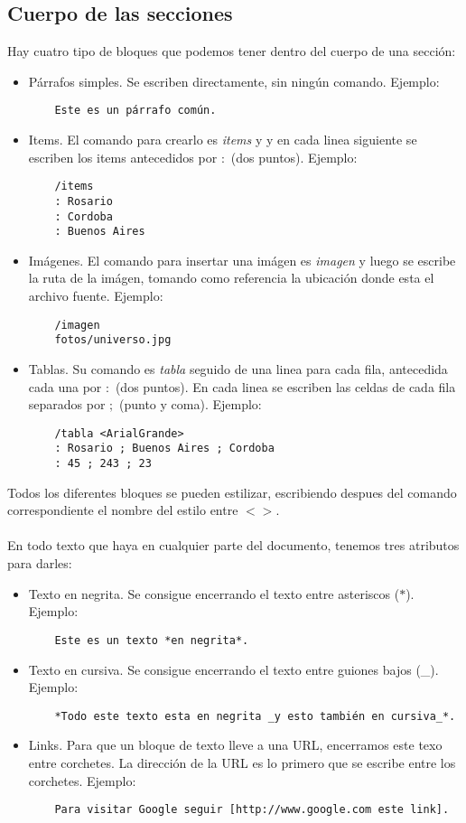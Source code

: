 \documentclass{article}
\begin{document}
\subsection{Cuerpo de las secciones}

Hay cuatro tipo de bloques que podemos tener dentro del cuerpo de una sección:
\begin{itemize}
    \item Párrafos simples. Se escriben directamente, sin ningún comando. Ejemplo:
    \begin{verbatim}
    Este es un párrafo común.
    \end{verbatim}
    \item Items. El comando para crearlo es \emph{items} y y en cada linea siguiente se escriben los items antecedidos por $:$ (dos puntos). Ejemplo:
    \begin{verbatim}
    /items
    : Rosario
    : Cordoba
    : Buenos Aires
    \end{verbatim}
    \item Imágenes. El comando para insertar una imágen es \emph{imagen} y luego se escribe la ruta de la imágen, tomando como referencia la ubicación donde esta el archivo fuente. Ejemplo:
    \begin{verbatim}
    /imagen
    fotos/universo.jpg
    \end{verbatim}
    \item Tablas. Su comando es \emph{tabla} seguido de una linea para cada fila, antecedida cada una por $:$ (dos puntos). En cada linea se escriben las celdas de cada fila separados por $;$ (punto y coma). Ejemplo:
    \begin{verbatim}
    /tabla <ArialGrande>
    : Rosario ; Buenos Aires ; Cordoba
    : 45 ; 243 ; 23
    \end{verbatim}
\end{itemize}
Todos los diferentes bloques se pueden estilizar, escribiendo despues del comando correspondiente el nombre del estilo entre $< >$.
\\~\\
En todo texto que haya en cualquier parte del documento, tenemos tres atributos para darles:
\begin{itemize}
    \item Texto en negrita. Se consigue encerrando el texto entre asteriscos ($*$). Ejemplo: \begin{verbatim}
    Este es un texto *en negrita*.
    \end{verbatim}
    \item Texto en cursiva. Se consigue encerrando el texto entre guiones bajos (\_). Ejemplo: \begin{verbatim}
    *Todo este texto esta en negrita _y esto también en cursiva_*.
    \end{verbatim}
    \item Links. Para que un bloque de texto lleve a una URL, encerramos este texo entre corchetes. La dirección de la URL es lo primero que se escribe entre los corchetes.
     Ejemplo: \begin{verbatim}
    Para visitar Google seguir [http://www.google.com este link].
    \end{verbatim}
\end{itemize}
\end{document}
